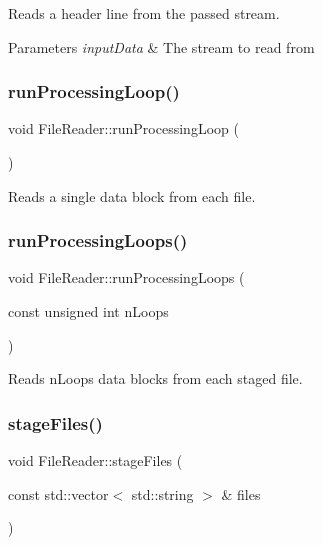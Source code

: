 Reads a header line from the passed stream. 


\begin{DoxyParams}{Parameters}
{\em input\+Data} & The stream to read from \\
\hline
\end{DoxyParams}
\mbox{\label{class_file_reader_a98606ec7d315f1ed6f90c531df0d09f9}} 
\subsubsection{\texorpdfstring{run\+Processing\+Loop()}{runProcessingLoop()}}
{\footnotesize\ttfamily void File\+Reader\+::run\+Processing\+Loop (\begin{DoxyParamCaption}{ }\end{DoxyParamCaption})\hspace{0.3cm}{\ttfamily [private]}}



Reads a single data block from each file. 

\mbox{\label{class_file_reader_a478ed77f1b8f76e15cb2faa8964a26e6}} 
\subsubsection{\texorpdfstring{run\+Processing\+Loops()}{runProcessingLoops()}}
{\footnotesize\ttfamily void File\+Reader\+::run\+Processing\+Loops (\begin{DoxyParamCaption}\item[{const unsigned int}]{n\+Loops }\end{DoxyParamCaption})}



Reads n\+Loops data blocks from each staged file. 

\mbox{\label{class_file_reader_a5d487d37857d537ace41c31d6594ef3a}} 
\subsubsection{\texorpdfstring{stage\+Files()}{stageFiles()}}
{\footnotesize\ttfamily void File\+Reader\+::stage\+Files (\begin{DoxyParamCaption}\item[{const std\+::vector$<$ std\+::string $>$ \&}]{files }\end{DoxyParamCaption})}



